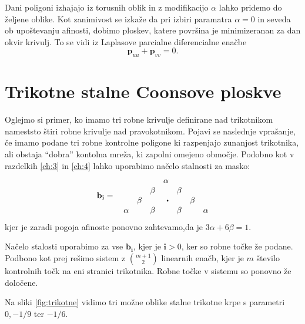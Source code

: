 \documentclass[a4paper,12pt]{article}
\begin{document}
Dani poligoni izhajajo iz torusnih oblik in z modifikacijo $\alpha$ lahko pridemo do željene oblike.
Kot zanimivost se izkaže da pri izbiri paramatra $\alpha = 0$ in seveda ob upoštevanju afinosti,
dobimo ploskev, katere površina je minimizeranan za dan okvir krivulj. To se vidi iz Laplasove parcialne 
diferencialne enačbe
$$\mathbf{p}_{uu} + \mathbf{p}_{vv} = 0.$$

\section{Trikotne stalne Coonsove ploskve}

Oglejmo si primer, ko imamo tri robne krivulje definirane nad trikotnikom 
nameststo štiri robne krivulje nad pravokotnikom.
Pojavi se naslednje vprašanje, če imamo podane tri robne kontrolne poligone 
ki razpenjajo zunanjost trikotnika, ali obstaja  ``dobra''
kontolna mreža, ki zapolni omejeno območje. 
Podobno kot v razdelkih \ref{ch:3} in \ref{ch:4} lahko uporabimo načelo 
stalnosti za masko:
$$
\mathbf{b}_{\mathbf{i}} =  \quad 
\begin{matrix*}[r]
          &       &       & \alpha   &       &       & \\
          &       & \beta &          & \beta &       & \\
          &         \beta &       & \sbullet &       & \beta & \\
   \alpha &       & \beta &          & \beta &       & \alpha
\end{matrix*}
$$
kjer je zaradi pogoja afinoste ponovno zahtevamo,da je $3\alpha + 6\beta = 1$.

Načelo stalosti uporabimo za vse $\mathbf{b}_{\mathbf{i}}$, kjer je $\mathbf{i} >0$,
ker so robne točke že podane. 
Podbono kot prej rešimo sistem z $\binom{m+1}{2}$ linearnih enačb, 
kjer je $m$ število kontrolnih točk na eni stranici trikotnika.
Robne točke v sistemu so ponovno že določene.

Na sliki \ref{fig:trikotne} vidimo tri možne oblike stalne trikotne
krpe s parametri $0,-1/9$ ter $-1/6$.
\end{document}
